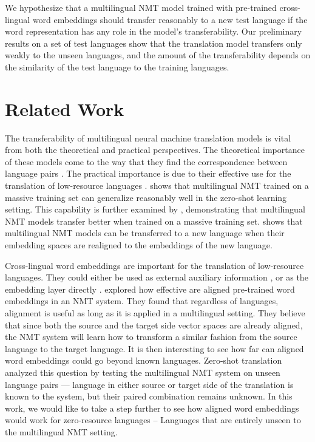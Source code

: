 \documentclass[11pt,a4paper]{article}
\begin{document}
We hypothesize that a multilingual NMT model trained with pre-trained cross-lingual word embeddings should transfer reasonably to a new test language if the word representation has any role in the model's transferability.
Our preliminary results on a set of test languages show that the translation model transfers only weakly to the unseen languages, and the amount of the transferability depends on the similarity of the test language to the training languages.

\section{Related Work}
The transferability of multilingual neural machine translation models is vital from both the theoretical and practical perspectives.
The theoretical importance of these models come to the way that they find the correspondence between language pairs \citep{Johnson:2016aa,lu-etal-2018-neural}.
The practical importance is due to their effective use for the translation of low-resource languages \citep{Zoph:2016aa,Nguyen:2017aa}.
\citet{Johnson:2016aa} shows that multilingual NMT trained on a massive training set can generalize reasonably well in the zero-shot learning setting.
This capability is further examined by \citet{aharoni-etal-2019-massively}, demonstrating that multilingual NMT models transfer better when trained on a massive training set.
\citet{Kim:2019aa} shows that multilingual NMT models can be transferred to a new language when their embedding spaces are realigned to the embeddings of the new language.

Cross-lingual word embeddings are important for the translation of low-resource languages.
They could either be used as external auxiliary information \cite{Conneau:2017aa, Lakew:2019aa}, or as the embedding layer directly \cite{neishi-etal-2017-bag,artetxe-etal-2017-learning}.
\citet{Qi:2018aa} explored how effective are aligned pre-trained word embeddings in an NMT system.
They found that regardless of languages, alignment is useful as long as it is applied in a multilingual setting.
They believe that since both the source and the target side vector spaces are already aligned, the NMT system will learn how to transform a similar fashion from the source language to the target language.
It is then interesting to see how far can aligned word embeddings could go beyond known languages.
Zero-shot translation analyzed this question by testing the multilingual NMT system on unseen language pairs --- language in either source or target side of the translation is known to the system, but their paired combination remains unknown.
In this work, we would like to take a step further to see how aligned word embeddings would work for zero-resource languages -- Languages that are entirely unseen to the multilingual NMT setting.
\end{document}
